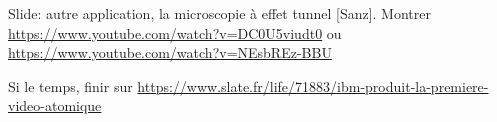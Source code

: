 \documentclass[11pt]{report}
\numberwithin{figure}{section}
\numberwithin{equation}{section}
\numberwithin{table}{section}
\newcommand{\1}{\boldsymbol{1}}
\begin{document}
Slide: autre application, la microscopie à effet tunnel [Sanz]. Montrer \url{https://www.youtube.com/watch?v=DC0U5viudt0} ou \url{https://www.youtube.com/watch?v=NEsbREz-BBU}

Si le temps, finir sur \url{https://www.slate.fr/life/71883/ibm-produit-la-premiere-video-atomique}


\newpage


\begin{comment}


\section*{Description de l'expérience}
  \addcontentsline{toc}{section}{Description de l'expérience}



\begin{tcolorbox}[breakable, enhanced, colback=red!2!white,colframe=mycolor!85!black,title=\textbf{\textbf{Expérience}}]
\paragraph*{Matériel}
\begin{itemize}
\item 
\end{itemize}

\paragraph*{Protocole } 

\begin{itemize}[label=$\triangleright$]
		\item 
\end{itemize}

\paragraph*{Aspect quantitatif :} Mesure de 
\end{equation}


\end{tcolorbox}


\end{comment}






%
%
%

\end{document}
